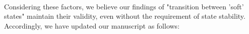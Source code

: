 {\\
Considering these factors, we believe our findings of "transition between 'soft' states" maintain their validity, even without the requirement of state stability. Accordingly, we have updated our manuscript as follows:
}

